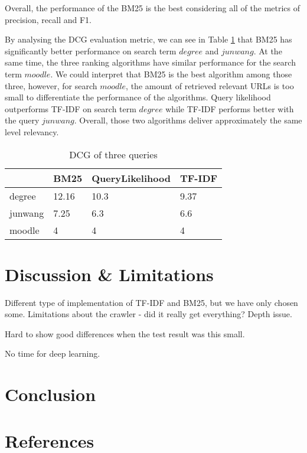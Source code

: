 Overall, the performance of the BM25 is the best considering all of the metrics of precision, recall and F1. 

By analysing the DCG evaluation metric, we can see in Table \ref{tab:dcg} that BM25 has significantly better performance on search term $degree$ and $jun wang$. At the same time, the three ranking algorithms have similar performance for the search term $moodle$. We could interpret that BM25 is the best algorithm among those three, however, for search $moodle$, the amount of retrieved relevant URLs is too small to differentiate the performance of the algorithms. Query likelihood outperforms TF-IDF on search term $degree$ while TF-IDF performs better with the query $jun wang$. Overall, those two algorithms deliver approximately the same level relevancy.


\begin{table}[]
\centering
\caption{DCG of three queries}
\label{tab:dcg}
\begin{tabular}{|l|l|l|l|}
\hline
        & BM25  & QueryLikelihood & TF-IDF \\ \hline
degree  & 12.16 & 10.3            & 9.37   \\ \hline
junwang & 7.25  & 6.3             & 6.6    \\ \hline
moodle  & 4     & 4               & 4      \\ \hline
\end{tabular}
\end{table}



\section{Discussion \& Limitations} %
\label{sec:discussion_&_limitations}

Different type of implementation of TF-IDF and BM25, but we have only chosen some. 
Limitations about the crawler - did it really get everything? Depth issue.

Hard to show good differences when the test result was this small.

No time for deep learning.




\section{Conclusion} %
\label{sec:conclusion}


\section{References} %
\label{sec:references}



